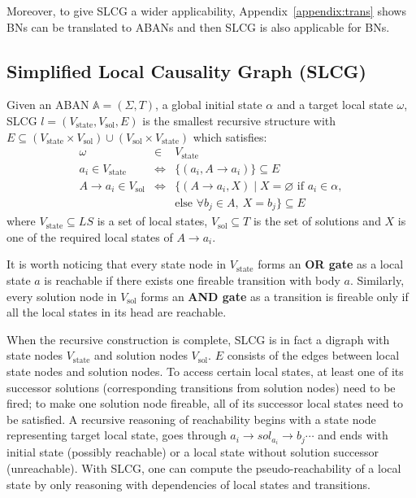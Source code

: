 \documentclass[runningheads]{llncs}
\newcommand{\st}{{\mathrm{state}}}
\newcommand{\sol}{{\mathrm{sol}}}
\begin{document}
Moreover, to give SLCG a wider applicability, Appendix~\ref{appendix:trans} shows BNs can be translated to ABANs and then SLCG is also applicable for BNs.

\subsection{Simplified Local Causality Graph (SLCG)}
\begin{definition}\label{defSLCG}
Given an ABAN $\mathbb{A} = (\Sigma,T)$, a global initial state $\alpha$ and a target local state $\omega$, SLCG $l= (V_\st,V_\sol,E)$ is the smallest recursive structure with $E \subseteq (V_\st\times V_\sol)\cup (V_\sol\times V_\st)$ which satisfies:
\begin{eqnarray*}
    \omega&\in& V_\st \\
    a_i\in V_\st &\Leftrightarrow& \{ (a_i, A\to a_i)\}\subseteq E \\
    A\to a_i\in V_\sol&\Leftrightarrow& \{ (A\to a_i,X)\mid X= \varnothing \text{ if } a_i\in \alpha,\\
    &&\text{else }\forall b_j\in A,\ X= b_j\}\subseteq E
\end{eqnarray*}
where $V_\st\subseteq LS$ is a set of local states, $V_\sol\subseteq T$ is the set of solutions and $X$ is one of the required local states of $A\to a_i$.
\end{definition}

\begin{remark}
It is worth noticing that every state node in $V_\st$ forms an \textbf{OR gate} as a local state $a$ is reachable if there exists one fireable transition with body $a$.
Similarly, every solution node in $V_\sol$ forms an \textbf{AND gate} as a transition is fireable only if all the local states in its head are reachable.
\end{remark}



When the recursive construction is complete, SLCG is in fact a digraph with state nodes $V_\st$ and solution nodes $V_\sol$. 
$E$ consists of the edges between local state nodes and solution nodes. 
To access certain local states, at least one of its successor solutions (corresponding transitions from solution nodes) need to be fired; to make one solution node fireable, all of its successor local states need to be satisfied. 
A recursive reasoning of reachability begins with a state node representing target local state, goes through $a_i\to sol_{a_i}\to b_j \cdots$ and ends with initial state (possibly reachable) or a local state without solution successor (unreachable). 
With SLCG, one can compute the pseudo-reachability of a local state by only reasoning with dependencies of local states and transitions.
\end{document}
